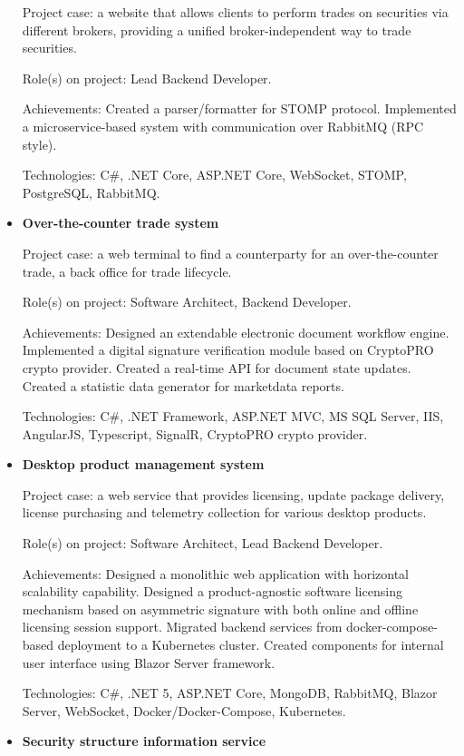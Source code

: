 \documentclass{article}
\begin{document}
\begin{itemize}
{        Project case: a website that allows clients to perform trades on securities via different brokers,
        providing a unified broker-independent way to trade securities.
        
        Role(s) on project: Lead Backend Developer.
        
        Achievements:
        Created a parser/formatter for STOMP protocol.
        Implemented a microservice-based system with communication over RabbitMQ (RPC style).
        
        Technologies: C\#, .NET Core, ASP.NET Core, WebSocket, STOMP, PostgreSQL, RabbitMQ.
    }
    \item {
        \textbf{Over-the-counter trade system}
        
        Project case: a web terminal to find a counterparty for an over-the-counter trade,
        a back office for trade lifecycle.
        
        Role(s) on project: Software Architect, Backend Developer.
        
        Achievements:
        Designed an extendable electronic document workflow engine.
        Implemented a digital signature verification module based on CryptoPRO crypto provider.
        Created a real-time API for document state updates.
        Created a statistic data generator for marketdata reports.
        
        Technologies: C\#, .NET Framework, ASP.NET MVC, MS SQL Server, IIS, AngularJS, Typescript, SignalR, CryptoPRO crypto provider.
    }
    \item {
        \textbf{Desktop product management system}
        
        Project case: a web service that provides licensing, update package delivery, license purchasing and telemetry collection for various desktop products.
        
        Role(s) on project: Software Architect, Lead Backend Developer.
        
        Achievements:
        Designed a monolithic web application with horizontal scalability capability.
        Designed a product-agnostic software licensing mechanism based on asymmetric signature with both online and offline licensing session support.
        Migrated backend services from docker-compose-based deployment to a Kubernetes cluster.
        Created components for internal user interface using Blazor Server framework.
        
        Technologies: C\#, .NET 5, ASP.NET Core, MongoDB, RabbitMQ, Blazor Server, WebSocket, Docker/Docker-Compose, Kubernetes.
    }
    \item {
        \textbf{Security structure information service}
        
}
\end{itemize}
\end{document}
